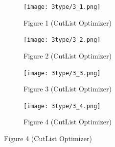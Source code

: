 \documentclass[a4paper]{article}
\begin{document}
\begin{figure}[H] %
  \centering
  \captionsetup{justification=centering, font=small} %
  
  \begin{subfigure}[b]{0.48\textwidth}
    \centering
   \texttt{[image: 3type/3\_1.png]}
    \caption{Figure 1 (CutList Optimizer)}
    \label{fig:1}
  \end{subfigure}
  \hfill
  \begin{subfigure}[b]{0.48\textwidth}
    \centering
    \texttt{[image: 3type/3\_2.png]}
    \caption{Figure 2 (CutList Optimizer)}
    \label{fig:2}
  \end{subfigure}

  \vspace{0.1cm} %
  
  \begin{subfigure}[b]{0.48\textwidth}
    \centering
    \texttt{[image: 3type/3\_3.png]}
    \caption{Figure 3 (CutList Optimizer) }
    \label{fig:3}
  \end{subfigure}
  \hfill
  \begin{subfigure}[b]{0.48\textwidth}
    \centering
    \texttt{[image: 3type/3\_4.png]}
    \caption{Figure 4 (CutList Optimizer) }
    \label{fig:4}
  \end{subfigure}

  \label{fig:all_images_part1}
\end{figure}
\end{document}
